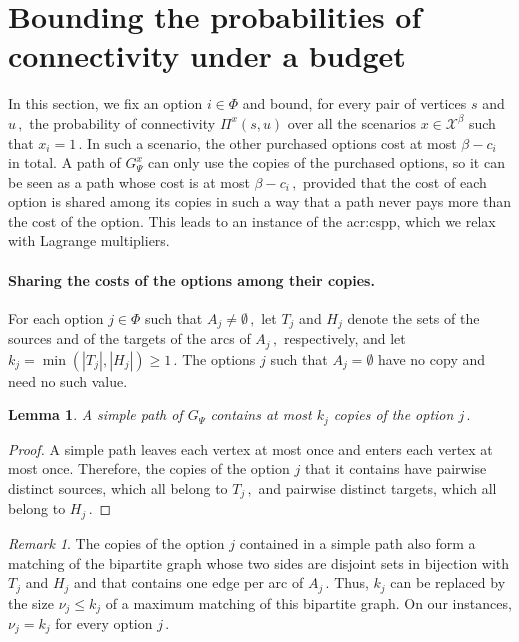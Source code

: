 \documentclass[11pt,a4paper]{report}
\newtheorem{lemma}[theorem]{Lemma}
\theoremstyle{definition}
\theoremstyle{remark}
\newtheorem*{remark}{Remark}
\begin{document}
\section{Bounding the probabilities of connectivity under a budget}\label{sec:big_m_lagrangian}

In this section, we fix an option $i \in \Phi$ and bound, for every pair of vertices $s$ and $u\,,$ the probability of connectivity $\Pi^x(s,u)$ over all the scenarios $x \in \mathcal{X}^\beta$ such that $x_i = 1\,.$ In such a scenario, the other purchased options cost at most $\beta - c_i$ in total. A path of $G^x_\Psi$ can only use the copies of the purchased options, so it can be seen as a path whose cost is at most $\beta - c_i\,,$ provided that the cost of each option is shared among its copies in such a way that a path never pays more than the cost of the option. This leads to an instance of the \gls{acr:cspp}, which we relax with Lagrange multipliers.

\noindent
\paragraph{Sharing the costs of the options among their copies.}
For each option $j \in \Phi$ such that $A_j \neq \emptyset\,,$ let $T_j$ and $H_j$ denote the sets of the sources and of the targets of the arcs of $A_j\,,$ respectively, and let $k_j = \min(|T_j|, |H_j|) \geq 1\,.$ The options $j$ such that $A_j = \emptyset$ have no copy and need no such value.

\begin{lemma}\label{lemma:big_m_simple_path_copies}
  A simple path of $G_\Psi$ contains at most $k_j$ copies of the option $j\,.$
\end{lemma}

\begin{proof}
  A simple path leaves each vertex at most once and enters each vertex at most once. Therefore, the copies of the option $j$ that it contains have pairwise distinct sources, which all belong to $T_j\,,$ and pairwise distinct targets, which all belong to $H_j\,.$
\end{proof}

\begin{remark}
  The copies of the option $j$ contained in a simple path also form a matching of the bipartite graph whose two sides are disjoint sets in bijection with $T_j$ and $H_j$ and that contains one edge per arc of $A_j\,.$ Thus, $k_j$ can be replaced by the size $\nu_j \leq k_j$ of a maximum matching of this bipartite graph. On our instances, $\nu_j = k_j$ for every option $j\,.$
\end{remark}
\end{document}
